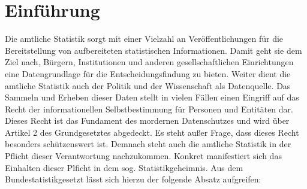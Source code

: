 

\hyphenation{}%

%





\tableofcontents%
\newpage%

\listoffigures%
\listoftables%
\lstlistoflistings

\newpage%


\onehalfspacing%


\section{Einführung}%

Die amtliche Statistik sorgt mit einer Vielzahl an Veröffentlichungen für die Bereitstellung von aufbereiteten statistischen Informationen. Damit geht sie dem Ziel nach, Bürgern, Institutionen und anderen gesellschaftlichen Einrichtungen eine Datengrundlage für die Entscheidungsfindung zu bieten. Weiter dient die amtliche Statistik auch der Politik und der Wissenschaft als Datenquelle. Das Sammeln und Erheben dieser Daten stellt in vielen Fällen einen Eingriff auf das Recht der informationellen Selbstbestimmung für Personen und Entitäten dar. Dieses Recht ist das Fundament des mordernen Datenschutzes und wird über Artikel 2 des Grundgesetztes abgedeckt. Es steht außer Frage, dass dieses Recht besonders schützenswert ist. Demnach steht auch die amtliche Statistik in der Pflicht dieser Verantwortung nachzukommen. Konkret manifestiert sich das Einhalten dieser Plficht in dem sog. Statistikgeheimnis. Aus dem Bundestatistikgesetzt lässt sich hierzu der folgende Absatz aufgreifen:

